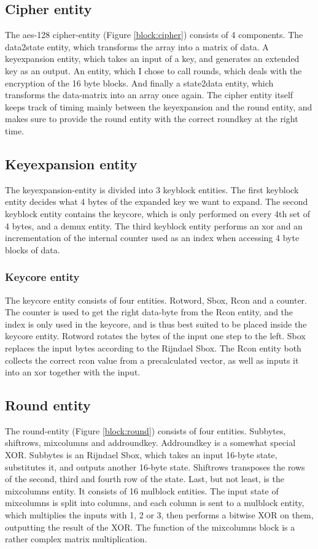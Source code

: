 \subsection{Cipher entity}
The aes-128 cipher-entity (Figure \ref{block:cipher}) consists of 4 
components. The data2state entity, which transforms the array into a 
matrix of data. A keyexpansion entity, which takes an input of a key, 
and generates an extended key as an output. An entity, which I chose to 
call rounds, which deals with the encryption of the 16 byte blocks. And 
finally a state2data entity, which transforms the data-matrix into an 
array once again. The cipher entity itself keeps track of timing mainly 
between the keyexpansion and the round entity, and makes sure to 
provide the round entity with the correct roundkey at the right time.

\subsection{Keyexpansion entity}
The keyexpansion-entity is divided into 3 keyblock entities. The first 
keyblock entity decides what 4 bytes of the expanded key we want to 
expand. The second keyblock entity contains the keycore, which is only 
performed on every 4th set of 4 bytes, and a demux entity. The third 
keyblock entity performs an xor and an incrementation of the internal 
counter used as an index when accessing 4 byte blocks of data.

\subsubsection{Keycore entity}
The keycore entity consists of four entities. Rotword, Sbox, Rcon and a 
counter. The counter is used to get the right data-byte from the Rcon 
entity, and the index is only used in the keycore, and is thus best 
suited to be placed inside the keycore entity. Rotword rotates the 
bytes of the input one step to the left. Sbox replaces the input bytes 
according to the Rijndael Sbox. The Rcon entity both collects the 
correct rcon value from a precalculated vector, as well as inputs it 
into an xor together with the input.

\subsection{Round entity}
The round-entity (Figure \ref{block:round}) consists of four entities. 
Subbytes, shiftrows, mixcolumns and addroundkey. Addroundkey is a 
somewhat special XOR. Subbytes is an Rijndael Sbox, which takes an 
input 16-byte state, substitutes it, and outputs another 16-byte state. 
Shiftrows transposes the rows of the second, third and fourth row of 
the state. Last, but not least, is the mixcolumns entity. It consists 
of 16 mulblock entities. The input state of mixcolumns is split into 
columns, and each column is sent to a mulblock entity, which multiplies 
the inputs with 1, 2 or 3, then performs a bitwise XOR on them, 
outputting the result of the XOR. The function of the mixcolumns block 
is a rather complex matrix multiplication.

